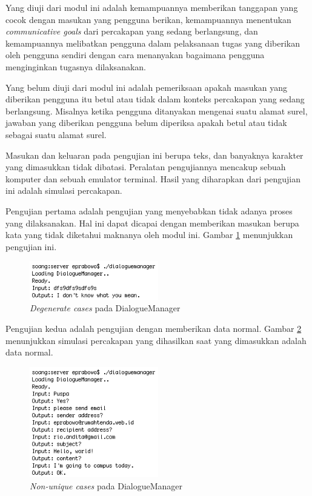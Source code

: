 Yang diuji dari modul ini adalah kemampuannya memberikan tanggapan yang cocok dengan masukan yang pengguna berikan,
kemampuannya menentukan \textit{communicative goals} dari percakapan yang sedang berlangsung,
dan kemampuannya melibatkan pengguna dalam pelaksanaan tugas yang diberikan oleh pengguna sendiri dengan cara menanyakan bagaimana pengguna menginginkan tugasnya dilaksanakan.

Yang belum diuji dari modul ini adalah pemeriksaan apakah masukan yang diberikan pengguna itu betul atau tidak dalam konteks percakapan yang sedang berlangsung.
Misalnya ketika pengguna ditanyakan mengenai suatu alamat surel,
jawaban yang diberikan pengguna belum diperiksa apakah betul atau tidak sebagai suatu alamat surel.

Masukan dan keluaran pada pengujian ini berupa teks,
dan banyaknya karakter yang dimasukkan tidak dibatasi.
Peralatan pengujiannya mencakup sebuah komputer dan sebuah emulator terminal.
Hasil yang diharapkan dari pengujian ini adalah simulasi percakapan.

Pengujian pertama adalah pengujian yang menyebabkan tidak adanya proses yang dilaksanakan.
Hal ini dapat dicapai dengan memberikan masukan berupa kata yang tidak diketahui maknanya oleh modul ini.
Gambar \ref{DialogueManagerDegenerate} menunjukkan pengujian ini.

\begin{figure}
\centering
\includegraphics[width=0.5\textwidth]{DialogueManagerDegenerate}
\caption{\textit{Degenerate cases} pada DialogueManager}
\label{DialogueManagerDegenerate}
\end{figure}

Pengujian kedua adalah pengujian dengan memberikan data normal.
Gambar \ref{DialogueManagerNonUnique} menunjukkan simulasi percakapan yang dihasilkan saat yang dimasukkan adalah data normal.

\begin{figure}
\centering
\includegraphics[width=0.5\textwidth]{DialogueManagerNonUnique}
\caption{\textit{Non-unique cases} pada DialogueManager}
\label{DialogueManagerNonUnique}
\end{figure}
